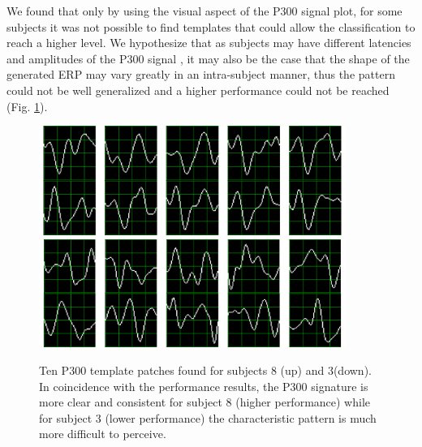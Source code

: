 \documentclass[entropy,article,submit,moreauthors,pdftex,10pt,a4paper]{mdpi}
\begin{document}
We found that only by using the visual aspect of the P300 signal plot,  for some subjects it was not possible to find templates that could allow the classification to reach a higher level.  We hypothesize that as subjects may have different latencies and amplitudes of the P300 signal \citep{Riccio2013}, it may also be the case that the shape of the generated ERP may vary greatly in an intra-subject manner, thus the pattern could not be well generalized and a higher performance could not be reached (Fig.  \ref{fig:p300templates}).

\begin{figure}[H]
\centering
\includegraphics[width=10cm]{subject8.png}
\includegraphics[width=10cm]{subject3.png}
\caption{Ten P300 template patches found for subjects 8 (up) and 3(down).  In coincidence with the performance results, the P300 signature is more clear and consistent for subject 8 (higher performance) while for subject 3 (lower performance) the characteristic pattern is much more difficult to perceive.}
\label{fig:p300templates}
\end{figure}



%
%
%
%
%
%
%
%
\end{document}

